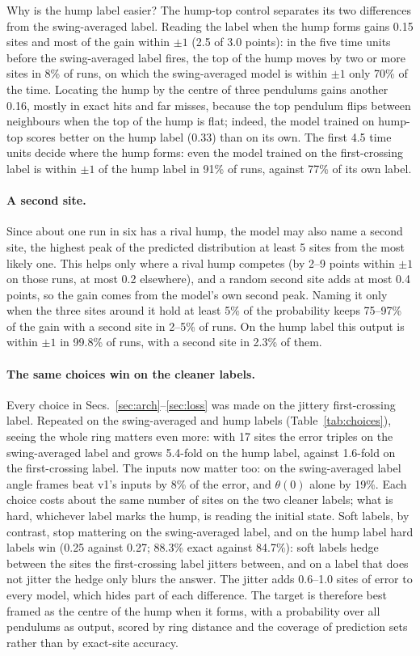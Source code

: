 \documentclass[11pt]{article}
\begin{document}
Why is the hump label easier? The hump-top control separates its two differences from the swing-averaged label. Reading the label when the hump forms gains 0.15 sites and most of the gain within $\pm1$ (2.5 of 3.0 points): in the five time units before the swing-averaged label fires, the top of the hump moves by two or more sites in 8\% of runs, on which the swing-averaged model is within $\pm1$ only 70\% of the time. Locating the hump by the centre of three pendulums gains another 0.16, mostly in exact hits and far misses, because the top pendulum flips between neighbours when the top of the hump is flat; indeed, the model trained on hump-top scores better on the hump label (0.33) than on its own. The first 4.5 time units decide where the hump forms: even the model trained on the first-crossing label is within $\pm1$ of the hump label in 91\% of runs, against 77\% of its own label.

\paragraph{A second site.} Since about one run in six has a rival hump, the model may also name a second site, the highest peak of the predicted distribution at least 5 sites from the most likely one. This helps only where a rival hump competes (by 2--9 points within $\pm1$ on those runs, at most 0.2 elsewhere), and a random second site adds at most 0.4 points, so the gain comes from the model's own second peak. Naming it only when the three sites around it hold at least 5\% of the probability keeps 75--97\% of the gain with a second site in 2--5\% of runs. On the hump label this output is within $\pm1$ in 99.8\% of runs, with a second site in 2.3\% of them.

\paragraph{The same choices win on the cleaner labels.} Every choice in Secs.~\ref{sec:arch}--\ref{sec:loss} was made on the jittery first-crossing label. Repeated on the swing-averaged and hump labels (Table~\ref{tab:choices}), seeing the whole ring matters even more: with 17 sites the error triples on the swing-averaged label and grows 5.4-fold on the hump label, against 1.6-fold on the first-crossing label. The inputs now matter too: on the swing-averaged label angle frames beat v1's inputs by 8\% of the error, and $\theta(0)$ alone by 19\%. Each choice costs about the same number of sites on the two cleaner labels; what is hard, whichever label marks the hump, is reading the initial state. Soft labels, by contrast, stop mattering on the swing-averaged label, and on the hump label hard labels win (0.25 against 0.27; 88.3\% exact against 84.7\%): soft labels hedge between the sites the first-crossing label jitters between, and on a label that does not jitter the hedge only blurs the answer. The jitter adds 0.6--1.0 sites of error to every model, which hides part of each difference. The target is therefore best framed as the centre of the hump when it forms, with a probability over all pendulums as output, scored by ring distance and the coverage of prediction sets rather than by exact-site accuracy.
\end{document}
